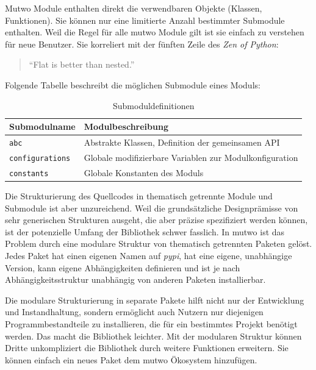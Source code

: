 \documentclass[12pt,a4paper,ngerman]{article}
\begin{document}
Mutwo Module enthalten direkt die verwendbaren Objekte (Klassen, Funktionen).
Sie können nur eine limitierte Anzahl bestimmter Submodule enthalten.
Weil die Regel für alle mutwo Module gilt ist sie einfach zu verstehen für neue Benutzer.
Sie korreliert mit der fünften Zeile des \emph{Zen of Python}:

\begin{quote}
    ``Flat is better than nested.''
\end{quote}

Folgende Tabelle beschreibt die möglichen Submodule eines Moduls:

\begin{table}[h!]
    \begin{center}
        \begin{tabular}{l l} 
            \hline
            Submodulname & Modulbeschreibung \\ [0.5ex] 
            \hline\hline
            \texttt{abc} & Abstrakte Klassen, Definition der gemeinsamen API \\
            \texttt{configurations} & Globale modifizierbare Variablen zur Modulkonfiguration \\
            \texttt{constants} & Globale Konstanten des Moduls \\
            \hline
        \end{tabular}
    \end{center}

    \caption{Submoduldefinitionen}
\end{table}

Die Strukturierung des Quellcodes in thematisch getrennte Module und Submodule ist aber unzureichend.
Weil die grundsätzliche Designprämisse von sehr generischen Strukturen ausgeht, die aber präzise spezifiziert werden können, ist der potenzielle Umfang der Bibliothek schwer fasslich.
In mutwo ist das Problem durch eine modulare Struktur von thematisch getrennten Paketen gelöst.
Jedes Paket hat einen eigenen Namen auf \emph{pypi}, hat eine eigene, unabhängige Version, kann eigene Abhängigkeiten definieren und ist je nach Abhängigkeitsstruktur unabhängig von anderen Paketen installierbar.

Die modulare Strukturierung in separate Pakete hilft nicht nur der Entwicklung und Instandhaltung, sondern ermöglicht auch Nutzern nur diejenigen Programmbestandteile zu installieren, die für ein bestimmtes Projekt benötigt werden.
Das macht die Bibliothek leichter.
Mit der modularen Struktur können Dritte unkompliziert die Bibliothek durch weitere Funktionen erweitern.
Sie können einfach ein neues Paket dem mutwo Ökosystem hinzufügen.
\end{document}
